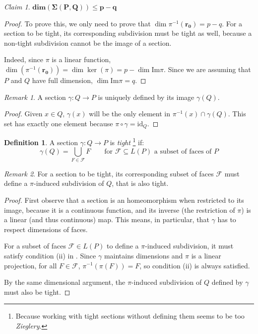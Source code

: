 \documentclass[10pt,a4paper]{article}
\theoremstyle{plain}
\theoremstyle{remark}
\newtheorem{claim}{Claim}
\newtheorem{remark}{Remark}
\theoremstyle{definition}
\newtheorem{definition}{Definition}
\begin{document}
\begin{claim}
	$\bm{\mbox{dim}(\Sigma(P,Q)) \leq p-q}$
\end{claim}
\begin{proof}
	To prove this, we only need to prove that 
	$\dim \pi^{-1}(\bm{r_0}) = p-q$. For a section to be tight, 
	its corresponding subdivision must be tight as well, 
	because a non-tight subdivision cannot be the image of a section.
	
	Indeed, since $\pi$ is a linear function, 
	$\dim(\pi^{-1}(\bm{r_0})) = \dim \ker(\pi) = p - \dim \mbox{Im} \pi$.
	Since we are assuming that $P$ and $Q$ have full dimension,
	${\dim\mbox{Im}\pi=q}$.
\end{proof}
\begin{remark}
	A section $\gamma:Q\to P$ is uniquely defined by its image $\gamma (Q)$.
\end{remark}
\begin{proof}
	Given $x\in Q$, $\gamma(x)$ will be the only element in 
	$\pi^{-1}(x)\cap \gamma(Q)$. 
	This set has exactly one element because $\pi\circ \gamma = \mathrm{id}_Q$.
\end{proof}

\begin{definition}
	A section $\gamma:Q\to P$ is \emph{tight}
	\footnote{Because working with tight sections without defining them
		seems to be too \emph{Zieglery}.}
	if:
	\begin{equation}
	\gamma(Q) = \bigcup_{F\in \mathcal F} F \qquad 
	\mbox{for $\mathcal F\subseteq L (P)$ a subset of faces of $P$}		
	\end{equation} 
\end{definition}
\begin{remark}
	For a section to be tight, its corresponding subset of faces $\mathcal{F}$
	must define a $\pi$-induced subdivision of $Q$, that is also tight.
\end{remark}
\begin{proof}
	First observe that a section is an homeomorphism when restricted to its image,
	because it is a continuous function, and its inverse (the restriction of $\pi$)
	is a linear (and thus continuous) map. 
	This means, in particular, that $\gamma$ has to respect dimensions of faces.
	
	For a subset of faces $\mathcal F\in L(P)$ to define a $\pi$-induced subdivision,
	it must satisfy condition (ii) in \cite[Def 9.1]{ziegler2012lectures}.
	Since $\gamma$ maintains dimensions and $\pi$ is a linear projection, 
	for all $F\in \mathcal F$, $\pi^{-1}(\pi(F)) = F$,
	so condition (ii) is always satisfied.
	
	By the same dimensional argument, the $\pi$-induced subdivision of $Q$ 
	defined by $\gamma$ must also be tight. 
\end{proof} 
\end{document}

